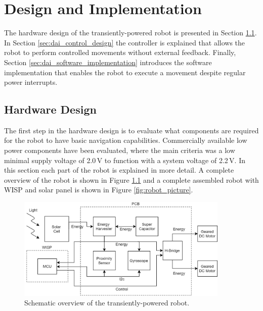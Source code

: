 \chapter{Design and Implementation}
\label{chp:design_and_implementation}

The hardware design of the transiently-powered robot is presented in Section \ref{sec:dai_hardware_design}.
In Section \ref{sec:dai_control_design} the controller is explained that allows the robot to perform controlled movements without external feedback.
Finally, Section \ref{sec:dai_software_implementation} introduces the software implementation that enables the robot to execute a movement despite regular power interrupts. 

\section{Hardware Design}
\label{sec:dai_hardware_design}
The first step in the hardware design is to evaluate what components are required for the robot to have basic navigation capabilities. 
Commercially available low power components have been evaluated, where the main criteria was a low minimal supply voltage of 2.0\,V to function with a system voltage of 2.2\,V.
In this section each part of the robot is explained in more detail.
A complete overview of the robot is shown in Figure \ref{fig:robot_overview} and a complete assembled robot with WISP and solar panel is shown in Figure \ref{fig:robot_picture}.

\vspace{1em}
\begin{figure}[h!]
	\centering
	\includegraphics[width=0.9\textwidth]{pics/schematic_robot_v2.png}
	\caption{Schematic overview of the transiently-powered robot.}
	\label{fig:robot_overview}
\end{figure}

